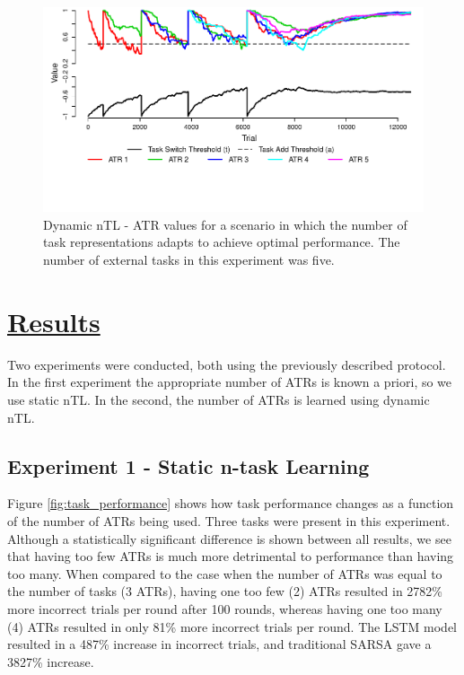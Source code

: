 \documentclass[10pt,letterpaper]{article}
\begin{document}
\begin{figure}[t!]
  \centering
  \includegraphics[scale=.75]{images/learn_num_tasks.pdf}
  \caption[]{Dynamic nTL - ATR values for a scenario in which the number of task representations adapts to achieve optimal performance. The number of external tasks in this experiment was five.}
  \label{fig:learn_num_tasks}
\end{figure}

\section{\underline{Results}}

Two experiments were conducted, both using the previously described protocol. In the first experiment the appropriate number of ATRs is known a priori, so we use static nTL. In the second, the number of ATRs is learned using dynamic nTL. 

\subsection{Experiment 1 - Static n-task Learning}

Figure \ref{fig:task_performance} shows how task performance changes as a function of the number of ATRs being used. Three tasks were present in this experiment. Although a statistically significant difference is shown between all results, we see that having too few ATRs is much more detrimental to performance than having too many. When compared to the case when the number of ATRs was equal to the number of tasks (3 ATRs), having one too few (2) ATRs resulted in 2782\% more incorrect trials per round after 100 rounds, whereas having one too many (4) ATRs resulted in only 81\% more incorrect trials per round. The LSTM model resulted in a 487\% increase in incorrect trials, and traditional SARSA gave a 3827\% increase.
\end{document}
